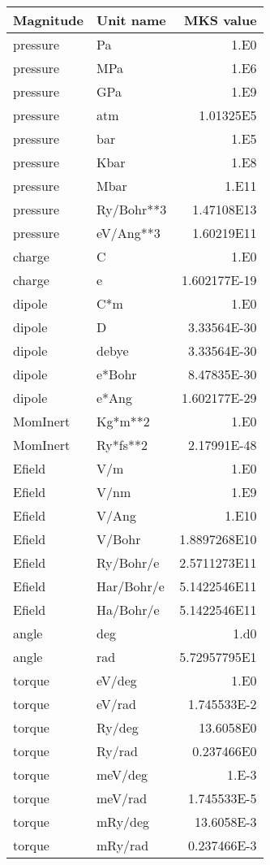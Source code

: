 \begin{center}
\begin{tabular}{llr}
Magnitude & Unit name & MKS value \\
\hline
pressure & Pa         & 1.E0 \\
pressure & MPa        & 1.E6 \\
pressure & GPa        & 1.E9 \\
pressure & atm        & 1.01325E5 \\
pressure & bar        & 1.E5 \\
pressure & Kbar       & 1.E8 \\
pressure & Mbar       & 1.E11 \\
pressure & Ry/Bohr**3 & 1.47108E13 \\
pressure & eV/Ang**3  & 1.60219E11 \\
charge   & C          & 1.E0 \\
charge   & e          & 1.602177E-19 \\
dipole   & C*m        & 1.E0 \\
dipole   & D          & 3.33564E-30 \\
dipole   & debye      & 3.33564E-30 \\
dipole   & e*Bohr     & 8.47835E-30 \\
dipole   & e*Ang      & 1.602177E-29 \\
MomInert & Kg*m**2    & 1.E0 \\
MomInert & Ry*fs**2   & 2.17991E-48 \\
Efield   & V/m        & 1.E0 \\
Efield   & V/nm       & 1.E9  \\
Efield   & V/Ang      & 1.E10 \\
Efield   & V/Bohr     & 1.8897268E10 \\
Efield   & Ry/Bohr/e  & 2.5711273E11 \\
Efield   & Har/Bohr/e & 5.1422546E11 \\
Efield   & Ha/Bohr/e  & 5.1422546E11 \\
angle    & deg        & 1.d0 \\
angle    & rad        & 5.72957795E1 \\
torque   & eV/deg     & 1.E0 \\
torque   & eV/rad     & 1.745533E-2 \\
torque   & Ry/deg     & 13.6058E0 \\
torque   & Ry/rad     & 0.237466E0 \\
torque   & meV/deg    & 1.E-3 \\
torque   & meV/rad    & 1.745533E-5 \\
torque   & mRy/deg    & 13.6058E-3 \\
torque   & mRy/rad    & 0.237466E-3 \\
\hline
\end{tabular}
\end{center}


